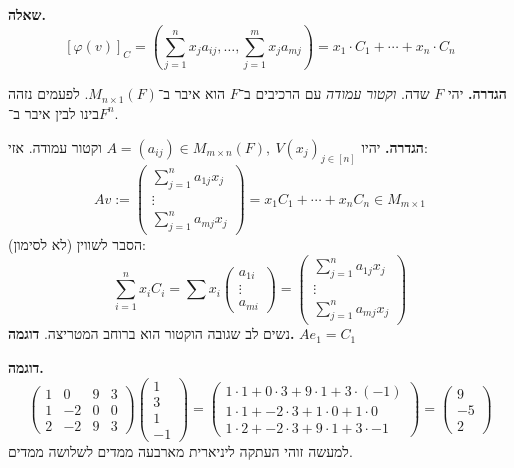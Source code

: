 \documentclass[]{article}
\newcommand\cl [1]    {\left ( #1 \right )}
\renewcommand\phi     {\varphi}
\begin{document}
	\textbf{שאלה. }
	\[ [\phi(v)]_C = \cl{\sum_{j = 1}^{n}x_ja_{ij}, \dots, \sum_{j = 1}^{m}x_ja_{mj}} = x_1\cdot C_1 + \cdots + x_n\cdot C_n \]
	
	\textbf{הגדרה. }יהי $F$ שדה. \textit{וקטור עמודה} עם הרכיבים ב־$F$ הוא איבר ב־$M_{n \times 1}(F)$. לפעמים נזהה בינו לבין איבר ב־$F^n$. 
	
	\textbf{הגדרה. }יהיו $A = (a_{ij}) \in M_{m \times n}(F), \ V(x_j)_{j \in [n]}$ וקטור עמודה. אזי: 
	\[ Av := \begin{pmatrix}
		\sum_{j = 1}^n a_{1j}x_j \\ \vdots \\ \sum_{j = 1}^{n}a_{mj}x_j
	\end{pmatrix} = x_1C_1 + \cdots + x_nC_n \in M_{m \times 1} \]
	הסבר לשווין (לא לסימון): 
	\[ \sum_{i = 1}^{n} x_iC_i = \sum x_i \begin{pmatrix}
		a_{1i} \\ \vdots \\ a_{mi}
	\end{pmatrix} = \begin{pmatrix}
		\sum_{j = 1}^n a_{1j}x_j \\ \vdots \\ \sum_{j = 1}^{n}a_{mj}x_j
	\end{pmatrix} \]
	נשים לב שגובה הוקטור הוא ברוחב המטריצה. 
	\textbf{דוגמה. }$Ae_1 = C_1$
	
	\textbf{דוגמה. }
	\[ \begin{pmatrix}
		1 & 0 & 9 & 3 \\ 1 & -2 & 0 & 0 \\ 2 & -2 & 9 & 3
	\end{pmatrix}\begin{pmatrix}
		1 \\ 3\\ 1 \\ -1
	\end{pmatrix} = \begin{pmatrix}
		1 \cdot 1 + 0 \cdot 3 + 9 \cdot 1 + 3 \cdot (-1) \\
		1 \cdot 1 + -2 \cdot 3 + 1 \cdot 0 + 1 \cdot 0 \\
		1 \cdot 2 + -2 \cdot 3 + 9 \cdot 1  + 3 \cdot -1
	\end{pmatrix} = \begin{pmatrix}
		9 \\ -5 \\ 2
	\end{pmatrix} \]
	למעשה זוהי העתקה ליניארית מארבעה ממדים לשלושה ממדים. 
	
\end{document}
